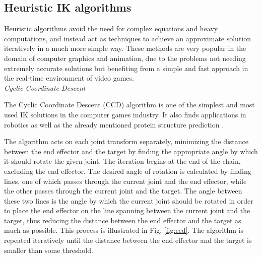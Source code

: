 \subsection{Heuristic IK algorithms}
Heuristic algorithms avoid the need for complex equations and heavy
computations, and instead act as techniques to achieve an approximate solution
iteratively in a much more simple way. These methods are very popular in the
domain of computer graphics and animation, due to the problems not needing
extremely accurate solutions but benefiting from a simple and fast approach in
the real-time environment of video games. \\

\noindent\textit{Cyclic Coordinate Descent}

The Cyclic Coordinate Descent (CCD) algorithm \cite{ccd} is one of the simplest and most
used IK solutions in the computer games industry. It also finds
applications in robotics as well as the already mentioned protein structure
prediction \cite{ccd_protein}. 

The algorithm acts on each joint transform separately, minimizing the distance
between the end effector and the target by finding the appropriate angle by
which it should rotate the given joint. The iteration begins at the end of the
chain, excluding the end effector. The desired angle of rotation is calculated by
finding lines, one of which passes through the current joint and the end
effector, while the other passes through the current joint and the target. The
angle between these two lines is the angle by which the current joint should
be rotated in order to place the end effector on the line spanning between the
current joint and the target, thus reducing the distance between the end
effector and the target as much as possible. This process is illustrated in Fig.
\ref{fig:ccd}. The algorithm is repeated iteratively until the distance between the end
effector and the target is smaller than some threshold.


